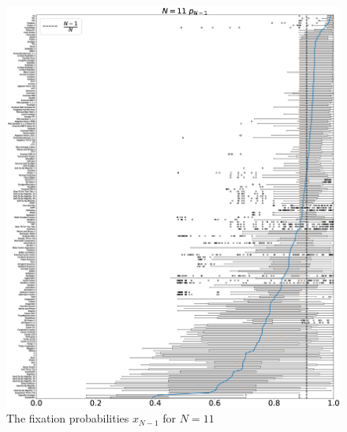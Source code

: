 \documentclass[10pt,letterpaper]{article}
\begin{document}
\begin{figure}[!hbtp]
    \centering
    \includegraphics[draft, width=\textwidth]{./Fig33.eps}
    \caption{The fixation probabilities \(x_{N-1}\) for \(N=11\)}
\end{figure}
\end{document}
